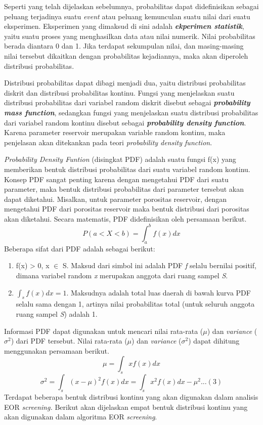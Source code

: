 \documentclass[
]{book}
\providecommand{\tightlist}{%
  \setlength{\itemsep}{0pt}\setlength{\parskip}{0pt}}
\begin{document}
Seperti yang telah dijelaskan sebelumnya, probabilitas dapat didefinisikan sebagai peluang terjadinya suatu \emph{event} atau peluang kemunculan suatu nilai dari suatu eksperimen. Eksperimen yang dimaksud di sini adalah \textbf{\emph{ekperimen statistik}}, yaitu suatu proses yang menghasilkan data atau nilai numerik. Nilai probabilitas berada diantara 0 dan 1. Jika terdapat sekumpulan nilai, dan masing-masing nilai tersebut dikaitkan dengan probabilitas kejadiannya, maka akan diperoleh distribusi probabilitas.

Distribusi probabilitas dapat dibagi menjadi dua, yaitu distribusi probabilitas diskrit dan distribusi probabilitas kontinu. Fungsi yang menjelaskan suatu distribusi probabilitas dari variabel random diskrit disebut sebagai \textbf{\emph{probability mass function}}, sedangkan fungsi yang menjelaskan suatu distribusi probabilitas dari variabel random kontinu disebut sebagai \textbf{\emph{probability density function}}. Karena parameter reservoir merupakan variable random kontinu, maka penjelasan akan ditekankan pada teori \emph{probability density function}.

\emph{Probability Density Funtion} (disingkat PDF) adalah suatu fungsi f(x) yang memberikan bentuk distribusi probabilitas dari suatu variabel random kontinu. Konsep PDF sangat penting karena dengan mengetahui PDF dari suatu parameter, maka bentuk distribusi probabilitas dari parameter tersebut akan dapat diketahui. Misalkan, untuk parameter porositas reservoir, dengan mengetahui PDF dari porositas reservoir maka bentuk distribusi dari porositas akan diketahui. Secara matematis, PDF didefinisikan oleh persamaan berikut.\[P(a<X<b)=\int_a^{b}f(x)dx\]
Beberapa sifat dari PDF adalah sebagai berikut:

\begin{enumerate}
\def\labelenumi{\arabic{enumi}.}
\tightlist
\item
  f(x) \textgreater{} 0, x \(\in\) S. Maksud dari simbol ini adalah PDF \emph{f} selalu bernilai positif, dimana variabel random \emph{x} merupakan anggota dari ruang sampel \emph{S}.
\item
  \(\int_s f(x)dx=1\). Maksudnya adalah total luas daerah di bawah kurva PDF selalu sama dengan 1, artinya nilai probabilitas total (untuk seluruh anggota ruang sampel \emph{S}) adalah 1.
\end{enumerate}

Informasi PDF dapat digunakan untuk mencari nilai rata-rata (\(\mu\)) dan \emph{variance} (\(\sigma^2\)) dari PDF tersebut. Nilai rata-rata (\(\mu\)) dan \emph{variance} (\(\sigma^2\)) dapat dihitung menggunakan persamaan berikut.\[\mu=\int_s xf(x)dx\] \[\sigma^2=\int_s (x-\mu)^2f(x)dx=\int_s x^2f(x)dx-\mu^2...(3)\]
Terdapat beberapa bentuk distribusi kontinu yang akan digunakan dalam analisis EOR \emph{screening.} Berikut akan dijelaskan empat bentuk distribusi kontinu yang akan digunakan dalam algoritma EOR \emph{screening}.
\end{document}
